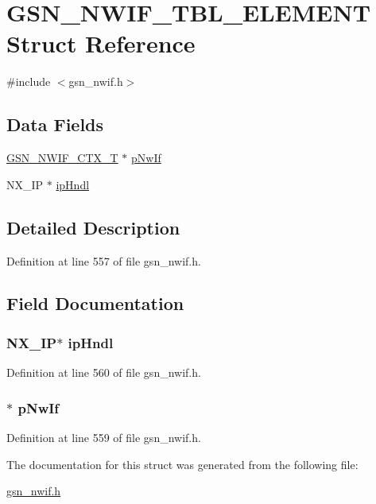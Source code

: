 \hypertarget{a00177}{
\section{GSN\_\-NWIF\_\-TBL\_\-ELEMENT Struct Reference}
\label{a00177}
}


{\ttfamily \#include $<$gsn\_\-nwif.h$>$}

\subsection*{Data Fields}
\begin{DoxyCompactItemize}
\item 
\hyperlink{a00167}{GSN\_\-NWIF\_\-CTX\_\-T} $\ast$ \hyperlink{a00177_a162db5da6960431ec48a784907bd6fb9}{pNwIf}
\item 
NX\_\-IP $\ast$ \hyperlink{a00177_a7205d734effcceac5631b5858d009570}{ipHndl}
\end{DoxyCompactItemize}


\subsection{Detailed Description}


Definition at line 557 of file gsn\_\-nwif.h.



\subsection{Field Documentation}
\hypertarget{a00177_a7205d734effcceac5631b5858d009570}{
\subsubsection[{ipHndl}]{\setlength{\rightskip}{0pt plus 5cm}NX\_\-IP$\ast$ {\bf ipHndl}}}
\label{a00177_a7205d734effcceac5631b5858d009570}


Definition at line 560 of file gsn\_\-nwif.h.

\hypertarget{a00177_a162db5da6960431ec48a784907bd6fb9}{
\subsubsection[{pNwIf}]{$\ast$ {\bf pNwIf}}}
\label{a00177_a162db5da6960431ec48a784907bd6fb9}


Definition at line 559 of file gsn\_\-nwif.h.



The documentation for this struct was generated from the following file:\begin{DoxyCompactItemize}
\item 
\hyperlink{a00534}{gsn\_\-nwif.h}\end{DoxyCompactItemize}

